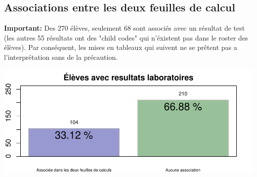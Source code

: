 \documentclass[11pt]{article}
\begin{document}
\begin{multicols}{2} 



\subsection*{Associations entre les deux feuilles de calcul}
\textbf{Important:} Des 270 élèves, seulement 68 sont associés avec un résultat de test (les autres 55 résultats ont des "child codes" qui n'éxistent pas dans le roster des élèves).  Par conséquent, les  mises en tableaux qui suivent ne se prêtent pas a l'interprétation sans de la précaution.
\vfill
\columnbreak


\end{multicols}
\begin{center}
\includegraphics{chik_analyse_pour_madsen-007}
\end{center}
\end{document}
